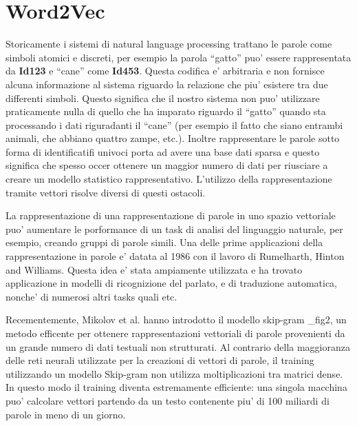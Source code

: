 \documentclass[a4paper,11pt]{book}
\theoremstyle{definition}
\begin{document}
\section{Word2Vec}
Storicamente i sistemi di natural language processing trattano le parole come simboli atomici e discreti,
per esempio la parola ``gatto'' puo' essere rappresentata da \textbf{Id123} e ``cane'' come \textbf{Id453}.
Questa codifica e' arbitraria e non fornisce alcuna informazione al sistema riguardo la relazione
che piu' esistere tra due differenti simboli.
Questo significa che il nostro sistema non puo' utilizzare praticamente nulla di quello che ha imparato
riguardo il ``gatto'' quando sta processando i dati riguradanti il ``cane'' (per esempio il fatto che siano
entrambi animali, che abbiano quattro zampe, etc.).
Inoltre rappresentare le parole sotto forma di identificatifi univoci porta ad avere una base dati sparsa
e questo significa che spesso occer ottenere un maggior numero di dati per riusciare a creare un modello
statistico rappresentativo.
L'utilizzo della rappresentazione tramite vettori risolve diversi di questi ostacoli.

La rappresentazione di una rappresentazione di parole in uno spazio vettoriale puo' aumentare le porformance
di un task di analisi del linguaggio naturale, per esempio, creando gruppi di parole simili. Una delle prime
applicazioni della rappresentazione in parole e' datata al 1986 con il lavoro di Rumelharth, Hinton and Williams.
Questa idea e' stata ampiamente utilizzata e ha trovato applicazione in modelli di ricognizione del parlato,
e di traduzione automatica, nonche' di numerosi altri tasks quali etc.

Recementemente, Mikolov et al. hanno introdotto il modello skip-gram \_fig2, un metodo efficente per ottenere
rappresentazioni vettoriali di parole provenienti da un grande numero di dati testuali non strutturati.
Al contrario della maggioranza delle reti neurali utilizzate per la creazioni di vettori di parole, 
il training utilizzando un modello Skip-gram non utilizza moltiplicazioni tra matrici dense.
In questo modo il training diventa estremamente efficiente: una singola macchina puo' calcolare vettori
partendo da un testo contenente piu' di 100 miliardi di parole in meno di un giorno.
\end{document}
